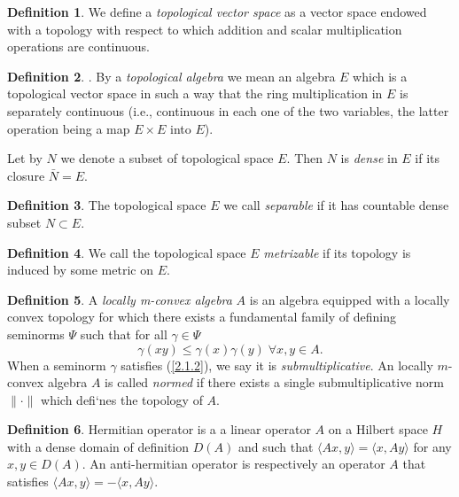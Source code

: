 \documentclass[12pt,a4paper]{report}
\theoremstyle{definition}
\newtheorem{definition}{Definition}
\begin{document}
\begin{appendix}
	
	\begin{definition}
		We define a \textit{topological vector space} as a vector space endowed with a topology with respect to which addition and scalar multiplication operations are continuous.
	\end{definition}

\begin{definition}\parencite[see][]{mallios2011topological}.
	By a \textit{topological algebra} we mean an algebra $E$ which is a topological vector space in such a way that the ring multiplication in $E$ is separately continuous (i.e., continuous in each one of the two variables, the latter operation being a map $E\times E$ into $E$).
\end{definition}

Let by $N$ we denote a subset of topological space $E$. Then $N$ is \textit{dense} in $E$ if its closure $\bar{N}=E$.

\begin{definition}
	The topological space $E$ we call \textit{separable} if it has countable dense subset $N\subset E$. 
\end{definition}

\begin{definition}
	We call the topological space $E$ \textit{metrizable} if its topology is induced by some metric on $E$.
\end{definition}



\begin{definition}\parencite[see][]{chevyrev2015characteristic}
	A \textit{locally m-convex algebra} $A$ is an algebra equipped with a locally convex topology for which there exists a fundamental family of defining seminorms $\Psi$ such that for all $\gamma \in \Psi$
	\begin{equation}\label{2.1.2}
		\gamma(xy) \leq \gamma(x)\gamma(y)\; \forall x, y \in A.
	\end{equation}
	When a seminorm $\gamma$ satisfies (\ref{2.1.2}), we say it is \textit{submultiplicative}. An locally $m$-convex algebra $ A$ is called \textit{normed} if there exists a single submultiplicative norm $\|\cdot \|$ which defi`nes the topology of $A$.
\end{definition}


\begin{definition}\parencite{akhiezer1981theory}
	Hermitian operator is a a linear operator $A$ on a Hilbert space $H$ with a dense domain of definition $D(A)$ and such that $⟨Ax,y⟩=⟨x,Ay⟩$ for any $x,y\in D(A)$. An anti-hermitian operator is respectively an operator $A$ that satisfies $⟨Ax,y⟩=-⟨x,Ay⟩$.
\end{definition}


\end{appendix}
\end{document}
